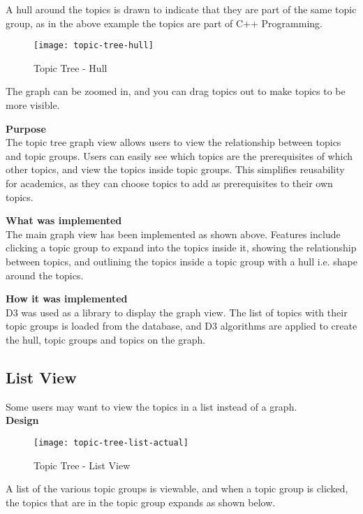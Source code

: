 A hull around the topics is drawn to indicate that they are part of the same topic group, as in the above example the topics are part of C++ Programming.\\

\begin{figure}[h!]
    \centering
    \texttt{[image: topic-tree-hull]}
    \caption{Topic Tree - Hull}
\end{figure}

The graph can be zoomed in, and you can drag topics out to make topics to be more visible. 

\textbf{Purpose} \\

The topic tree graph view allows users to view the relationship between topics and topic groups. Users can easily see which topics are the prerequisites of which other topics, and view the topics inside topic groups. This simplifies reusability for academics, as they can choose topics to add as prerequisites to their own topics.

\textbf{What was implemented} \\
The main graph view has been implemented as shown above. Features include clicking a topic group to expand into the topics inside it, showing the relationship between topics, and outlining the topics inside a topic group with a hull i.e. shape around the topics.

\textbf{How it was implemented} \\
D3 was used as a library to display the graph view. The list of topics with their topic groups is loaded from the database, and D3 algorithms are applied to create the hull, topic groups and topics on the graph.


\subsection{List View}


Some users may want to view the topics in a list instead of a graph.\\

\textbf{Design} \\

\begin{figure}[h!]
    \centering
    \texttt{[image: topic-tree-list-actual]}
    \caption{Topic Tree - List View}
\end{figure}

A list of the various topic groups is viewable, and when a topic group is clicked, the topics that are in the topic group expands as shown below.\\

